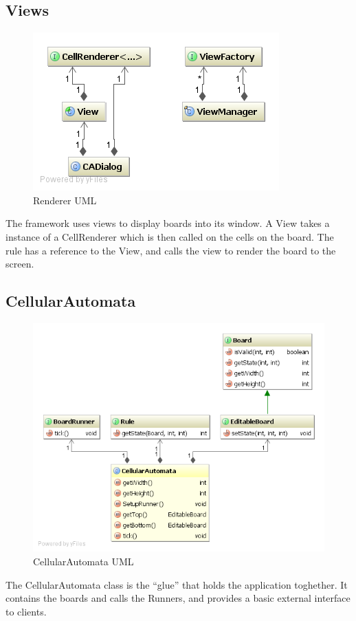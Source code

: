 \documentclass{report}
\begin{document}
\subsection{Views}
\begin{figure}[H]
\includegraphics[scale=.4]{RendererCD}
\caption{Renderer UML}
\label{UML:renderer}
\end{figure}
The framework uses views to display boards into its window. A View takes a
instance of a CellRenderer which is then called on the cells on the board. The
rule has a reference to the View, and calls the view to render the board to the
screen.
\subsection{CellularAutomata}
\begin{figure}[H]
\includegraphics[scale=.4]{CellularAutomataCD}
\caption{CellularAutomata UML}
\label{UML:ca}
\end{figure}
The CellularAutomata class is the ``glue'' that holds the application toghether.
It contains the boards and calls the Runners, and provides a basic external
interface to clients.
\end{document}
